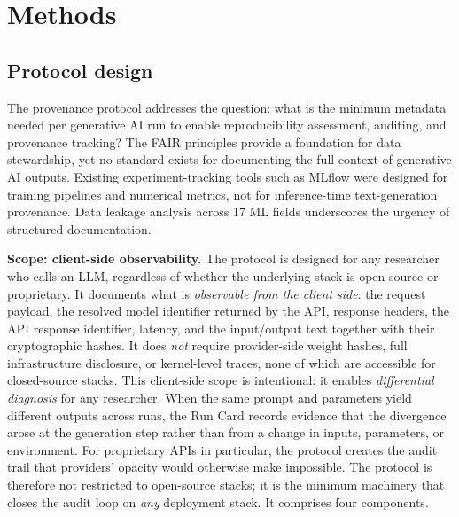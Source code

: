 \documentclass[sn-nature]{sn-jnl}
\begin{document}
\section{Methods}\label{sec:methods}

\subsection{Protocol design}\label{subsec:protocol}

The provenance protocol addresses the question: what is the minimum metadata needed per generative AI run to enable reproducibility assessment, auditing, and provenance tracking?
The FAIR principles\cite{wilkinson2016fair} provide a foundation for data stewardship, yet no standard exists for documenting the full context of generative AI outputs.
Existing experiment-tracking tools such as MLflow\cite{zaharia2018accelerating} were designed for training pipelines and numerical metrics, not for inference-time text-generation provenance.
Data leakage analysis across 17 ML fields\cite{kapoor2023leakage} underscores the urgency of structured documentation.

\textbf{Scope: client-side observability.}
The protocol is designed for any researcher who calls an LLM, regardless of whether the underlying stack is open-source or proprietary.
It documents what is \emph{observable from the client side}: the request payload, the resolved model identifier returned by the API, response headers, the API response identifier, latency, and the input/output text together with their cryptographic hashes.
It does \emph{not} require provider-side weight hashes, full infrastructure disclosure, or kernel-level traces, none of which are accessible for closed-source stacks.
This client-side scope is intentional: it enables \emph{differential diagnosis} for any researcher.
When the same prompt and parameters yield different outputs across runs, the Run Card records evidence that the divergence arose at the generation step rather than from a change in inputs, parameters, or environment.
For proprietary APIs in particular, the protocol creates the audit trail that providers' opacity would otherwise make impossible.
The protocol is therefore not restricted to open-source stacks; it is the minimum machinery that closes the audit loop on \emph{any} deployment stack.
It comprises four components.
\end{document}
